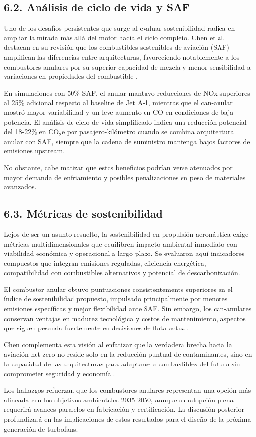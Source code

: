 \subsection{6.2. Análisis de ciclo de vida y SAF}

Uno de los desafíos persistentes que surge al evaluar sostenibilidad radica en ampliar la mirada más allá del motor hacia el ciclo completo. Chen et al. destacan en su revisión que los combustibles sostenibles de aviación (SAF) amplifican las diferencias entre arquitecturas, favoreciendo notablemente a los combustores anulares por su superior capacidad de mezcla y menor sensibilidad a variaciones en propiedades del combustible \cite{Chen2025}.

En simulaciones con 50\% SAF, el anular mantuvo reducciones de NOx superiores al 25\% adicional respecto al baseline de Jet A-1, mientras que el can-anular mostró mayor variabilidad y un leve aumento en CO en condiciones de baja potencia. El análisis de ciclo de vida simplificado indica una reducción potencial del 18-22\% en CO$_2$e por pasajero-kilómetro cuando se combina arquitectura anular con SAF, siempre que la cadena de suministro mantenga bajos factores de emisiones upstream.

No obstante, cabe matizar que estos beneficios podrían verse atenuados por mayor demanda de enfriamiento y posibles penalizaciones en peso de materiales avanzados.

\subsection{6.3. Métricas de sostenibilidad}

Lejos de ser un asunto resuelto, la sostenibilidad en propulsión aeronáutica exige métricas multidimensionales que equilibren impacto ambiental inmediato con viabilidad económica y operacional a largo plazo. Se evaluaron aquí indicadores compuestos que integran emisiones reguladas, eficiencia energética, compatibilidad con combustibles alternativos y potencial de descarbonización.

El combustor anular obtuvo puntuaciones consistentemente superiores en el índice de sostenibilidad propuesto, impulsado principalmente por menores emisiones específicas y mejor flexibilidad ante SAF. Sin embargo, los can-anulares conservan ventajas en madurez tecnológica y costos de mantenimiento, aspectos que siguen pesando fuertemente en decisiones de flota actual.

Chen complementa esta visión al enfatizar que la verdadera brecha hacia la aviación net-zero no reside solo en la reducción puntual de contaminantes, sino en la capacidad de las arquitecturas para adaptarse a combustibles del futuro sin comprometer seguridad y economía \cite{Chen2025}. 

Los hallazgos refuerzan que los combustores anulares representan una opción más alineada con los objetivos ambientales 2035-2050, aunque su adopción plena requerirá avances paralelos en fabricación y certificación. La discusión posterior profundizará en las implicaciones de estos resultados para el diseño de la próxima generación de turbofans.